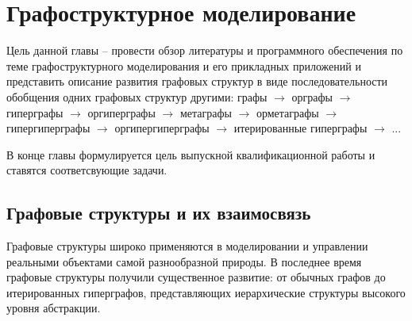 \section{Графоструктурное моделирование} 
Цель данной главы -- провести обзор литературы и программного обеспечения по теме графоструктурного моделирования и его прикладных приложений и представить описание развития графовых структур в виде последовательности обобщения одних графовых структур другими: графы $\to$ орграфы $\to$ гиперграфы $\to$ оргиперграфы $\to$ метаграфы $\to$ орметаграфы $\to$ гипергиперграфы $\to$ оргипергиперграфы $\to$ итерированные гиперграфы $\to$ ...

В конце главы формулируется цель выпускной квалификационной работы и ставятся соответсвующие задачи.

\subsection{Графовые структуры и их взаимосвязь}
Графовые структуры широко применяются в моделировании и управлении реальными объектами самой разнообразной природы. В последнее время графовые структуры получили существенное развитие: от обычных графов до итерированных гиперграфов, представляющих иерархические структуры высокого уровня абстракции. 

